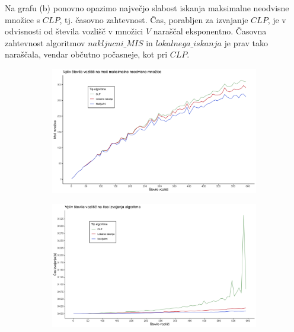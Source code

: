 \documentclass[a4paper, 12pt]{article}
\begin{document}
\noindent Na grafu (b) ponovno opazimo največjo slabost iskanja maksimalne neodvisne množice s $CLP$, tj. časovno zahtevnost. Čas, porabljen za izvajanje $CLP$, je v odvisnosti od števila vozlišč v množici $V$
naraščal eksponentno. Časovna zahtevnost algoritmov $nakljucni\_MIS$ in $lokalnega\_iskanja$ je prav tako naraščala, vendar občutno počasneje, kot pri $CLP$.


\begin{figure}[h!]
	\begin{center}
		\begin{subfigure}{0.49\textwidth}
		\begin{center}
			\includegraphics[width=\textwidth]{R_koda/voz-moc.png}
	\end{center}
		\end{subfigure}
		\begin{subfigure}{0.49\textwidth}
		\begin{center}
			\includegraphics[width=\textwidth]{R_koda/voz-cas.png}
	\end{center}
		\end{subfigure}
	\end{center}
\end{figure}
\end{document}
